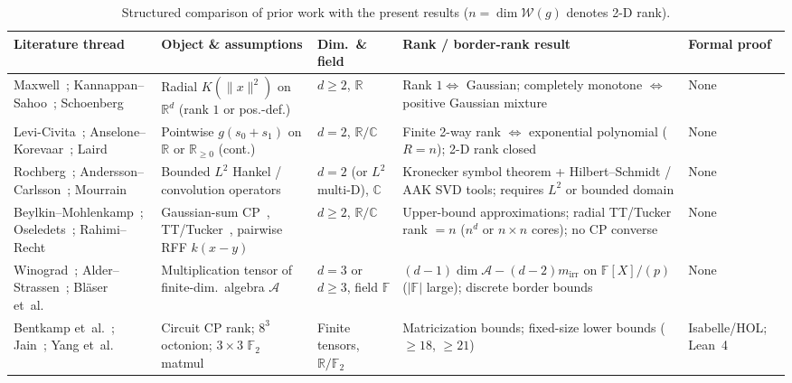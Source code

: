 \documentclass[11pt,a4paper]{article}
\theoremstyle{plain}
\theoremstyle{definition}
\newcommand{\R}{\mathbb{R}}
\newcommand{\C}{\mathbb{C}}
\newcommand{\Field}{\mathbb{F}}
\newcommand{\Rnn}{\mathbb{R}_{\ge 0}}
\begin{document}
\begin{table}[t]
\centering
\caption{Structured comparison of prior work with the present results ($n = \dim\mathcal{W}(g)$ denotes 2-D rank).}\label{tab:related_work}
\smallskip
{\scriptsize\setlength{\tabcolsep}{2.3pt}
\begin{tabular}{@{}>{\raggedright\arraybackslash}p{3.0cm}>{\raggedright\arraybackslash}p{2.8cm}>{\raggedright\arraybackslash}p{2.2cm}>{\raggedright\arraybackslash}p{4.4cm}>{\raggedright\arraybackslash}p{2.1cm}@{}}
\toprule
Literature thread & Object \& assumptions & Dim.\ \& field & Rank / border-rank result & Formal proof \\
\midrule
Maxwell~\cite{maxwell1860illustrations}; Kannappan--Sahoo~\cite{kannappan1992rotation}; Schoenberg~\cite{schoenberg1938metric} & Radial $K(\|x\|^2)$ on $\R^d$ (rank $1$ or pos.-def.) & $d \ge 2$, $\R$ & Rank $1 \iff$ Gaussian; completely monotone $\iff$ positive Gaussian mixture & None \\
Levi-Civita~\cite{levicivita1913}; Anselone--Korevaar~\cite{anselone1964}; Laird~\cite{laird1979characterizations} & Pointwise $g(s_0 + s_1)$ on $\R$ or $\Rnn$ (cont.) & $d = 2$, $\R / \C$ & Finite 2-way rank $\iff$ exponential polynomial ($R = n$); 2-D rank closed & None \\
Rochberg~\cite{rochberg1987toeplitz}; Andersson--Carlsson~\cite{andersson2015truncated}; Mourrain~\cite{mourrain2018polynomial} & Bounded $L^2$ Hankel / convolution operators & $d = 2$ (or $L^2$ multi-D), $\C$ & Kronecker symbol theorem + Hilbert--Schmidt / AAK SVD tools; requires $L^2$ or bounded domain & None \\
Beylkin--Mohlenkamp~\cite{beylkin2005algorithms}; Oseledets~\cite{oseledets2011tensor}; Rahimi--Recht~\cite{rahimi2007random} & Gaussian-sum CP~\cite{braess1986nonlinear,beylkin2005exponentials}, TT/Tucker~\cite{kolda2009tensor,hackbusch2012tensor}, pairwise RFF $k(x{-}y)$ & $d \ge 2$, $\R / \C$ & Upper-bound approximations; radial TT/Tucker rank $= n$ ($n^d$ or $n{\times}n$ cores); no CP converse & None \\
Winograd~\cite{winograd1977some}; Alder--Strassen~\cite{alder1981alg}; Bl\"aser et~al.~\cite{blaser2023multilinear} & Multiplication tensor of finite-dim.\ algebra $\mathcal{A}$ & $d = 3$ or $d \ge 3$, field $\Field$ & $(d{-}1)\dim\mathcal{A} - (d{-}2)m_{\mathrm{irr}}$ on $\Field[X]/(p)$ ($|\Field|$ large); discrete border bounds~\cite{bini1979complexity,landsberg2012tensors,zuiddam2017note,chang2026border} & None \\
Bentkamp et~al.~\cite{bentkamp2019formal}; Jain~\cite{jain2026octonion}; Yang et~al.~\cite{yang2026matrix} & Circuit CP rank; $8^3$ octonion; $3{\times}3$ $\mathbb{F}_2$ matmul & Finite tensors, $\R / \mathbb{F}_2$ & Matricization bounds; fixed-size lower bounds ($\ge 18$, $\ge 21$) & Isabelle/HOL; Lean~4 \\

\end{tabular}}
\end{table}
\end{document}
